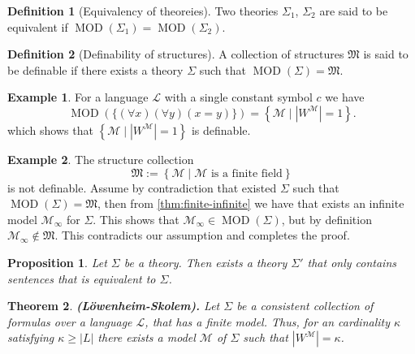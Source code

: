 \documentclass[11pt,a4paper]{article}
\theoremstyle{definition}
\newtheorem{definition}{Definition}[section]
\newtheorem{example}{Example}[section]
\theoremstyle{plain}
\newtheorem{theorem}{Theorem}[section]
\newtheorem{proposition}[theorem]{Proposition}
\DeclareMathOperator{\MOD}{MOD}
\newcommand{\R}{\mathbb{R}}
\newcommand{\M}{\mathcal{M}}
\renewcommand{\L}{\mathcal{L}}
\newcommand{\set}[2]{ \left\{ #1 \mid #2 \right\} }
\renewcommand{\tt}[1]{\textnormal{\textbf{(#1).}}} %
\begin{document}
  \begin{definition}[Equivalency of theoreies]
    Two theories $\Sigma_1$, $\Sigma_2$ are said to be equivalent if
    $\MOD(\Sigma_1) = \MOD(\Sigma_2)$.
  \end{definition}

  \begin{definition}[Definability of structures]
    A collection of structures $\mathfrak M$ is said to be definable
    if there exists a theory $\Sigma$ such that $\MOD(\Sigma) = \mathfrak M$.
  \end{definition}

  \begin{example}
    For a language $\L$ with a single constant symbol $c$ we have
    \[
      \MOD(\{(\forall x)(\forall y)(x = y)\}) =
      \set{\M}{|W^\M| = 1}.
    \]
    which shows that $\set{\M}{|W^\M| = 1}$ is definable.
  \end{example}

  \begin{example}
    The structure collection
    \[ \mathfrak M := \set{\M}{\text{$\M$ is a finite field}} \]
    is not definable.
    Assume by contradiction that existed $\Sigma$ such that 
    $\MOD(\Sigma) = \mathfrak M$, then from 
    \autoref{thm:finite-infinite}
    we have that exists an infinite model $\M_\infty$ for $\Sigma$.
    This shows that $\M_\infty \in \MOD(\Sigma)$, but by definition
    $\M_\infty \notin \mathfrak M$.
    This contradicts our assumption and completes the proof.
  \end{example}


  \begin{proposition}
    Let $\Sigma$ be a theory. Then exists a theory $\Sigma'$ that only contains
    sentences that is equivalent to $\Sigma$.
  \end{proposition}

  \begin{theorem}\tt{Löwenheim-Skolem}
    Let $\Sigma$ be a consistent collection of formulas over a language $\L$,
    that has a finite model. Thus, for an cardinality $\kappa$ satisfying
    $\kappa \geq |L|$ there exists a model $\M$ of $\Sigma$ such that
    $|W^\M| = \kappa$.
  \end{theorem}
\end{document}
